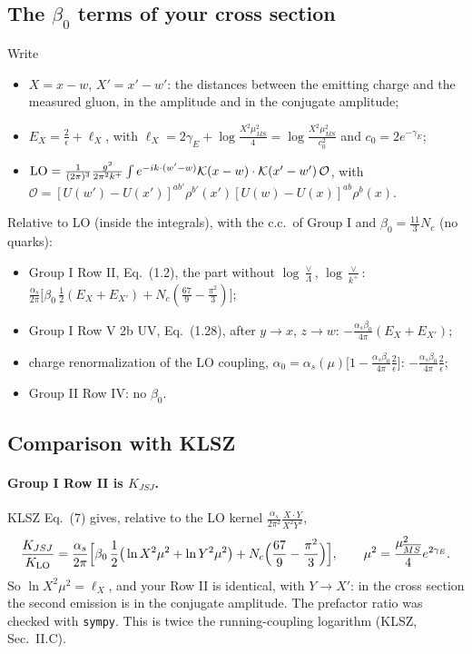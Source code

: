 \documentclass[10pt]{article}
\numberwithin{equation}{section}
\begin{document}
\subsection{The $\beta_0$ terms of your cross section}
Write
\begin{itemize}
\item $X=x-w$, $X'=x'-w'$: the distances between the emitting charge and the measured gluon, in the amplitude and in the conjugate amplitude;
\item $E_X=\frac2\epsilon+\ell_X$, with $\ell_X=2\gamma_E+\log\frac{X^2\mu^2_{\overline{MS}}}{4}=\log\frac{X^2\mu^2_{\overline{MS}}}{c_0^2}$ and $c_0=2e^{-\gamma_E}$;
\item ${\rm LO}=\frac{1}{(2\pi)^3}\frac{g^2}{2\pi^2k^+}\int e^{-ik\cdot(w'-w)}\mathcal K(x-w)\cdot\mathcal K(x'-w')\,\mathcal O$, with $\mathcal O=[U(w')-U(x')]^{ab'}\rho^{b'}(x')[U(w)-U(x)]^{ab}\rho^b(x)$.
\end{itemize}
Relative to LO (inside the integrals), with the c.c.\ of Group I and $\beta_0=\frac{11}{3}N_c$ (no quarks):
\begin{itemize}
\item Group I Row II, Eq.~(1.2), the part without $\log\frac{\vee}{\Lambda}$, $\log\frac{\vee}{k^+}$: $\frac{\alpha_s}{2\pi}\big[\beta_0\,\frac12(E_X+E_{X'})+N_c(\frac{67}{9}-\frac{\pi^2}{3})\big]$;
\item Group I Row V 2b UV, Eq.~(1.28), after $y\to x$, $z\to w$: $-\frac{\alpha_s\beta_0}{4\pi}(E_X+E_{X'})$;
\item charge renormalization of the LO coupling, $\alpha_0=\alpha_s(\mu)\big[1-\frac{\alpha_s\beta_0}{4\pi}\frac2\epsilon\big]$: $-\frac{\alpha_s\beta_0}{4\pi}\frac{2}{\epsilon}$;
\item Group II Row IV: no $\beta_0$.
\end{itemize}

\subsection{Comparison with KLSZ}
\paragraph{Group I Row II is $K_{JSJ}$.} KLSZ Eq.~(7) gives, relative to the LO kernel $\frac{\alpha_s}{2\pi^2}\frac{X\cdot Y}{X^2Y^2}$,
\begin{equation*}
\frac{K_{JSJ}}{K_{\rm LO}}=\frac{\alpha_s}{2\pi}\Big[\beta_0\,\frac12\big(\ln X^2\mu^2+\ln Y^2\mu^2\big)+N_c\Big(\frac{67}{9}-\frac{\pi^2}{3}\Big)\Big],\qquad \mu^2=\frac{\mu^2_{\overline{MS}}}{4}e^{2\gamma_E}.
\end{equation*}
So $\ln X^2\mu^2=\ell_X$, and your Row II is identical, with $Y\to X'$: in the cross section the second emission is in the conjugate amplitude. The prefactor ratio was checked with \texttt{sympy}. This is twice the running-coupling logarithm (KLSZ, Sec.~II.C).
\end{document}
